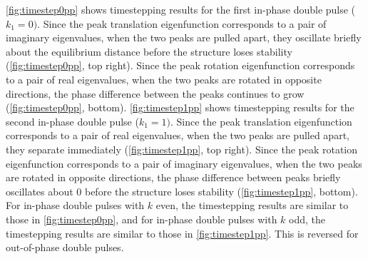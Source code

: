 \documentclass[12pt]{elsarticle}
\begin{document}
\cref{fig:timestep0pp} shows timestepping results for the first in-phase double pulse ($k_1 = 0)$. Since the peak translation eigenfunction corresponds to a pair of imaginary eigenvalues, when the two peaks are pulled apart, they oscillate briefly about the equilibrium distance before the structure loses stability (\cref{fig:timestep0pp}, top right). Since the peak rotation eigenfunction corresponds to a pair of real eigenvalues, when the two peaks are rotated in opposite directions, the phase difference between the peaks continues to grow (\cref{fig:timestep0pp}, bottom). \cref{fig:timestep1pp} shows timestepping results for the second in-phase double pulse ($k_1 = 1)$. Since the peak translation eigenfunction corresponds to a pair of real eigenvalues, when the two peaks are pulled apart, they separate immediately (\cref{fig:timestep1pp}, top right). Since the peak rotation eigenfunction corresponds to a pair of imaginary eigenvalues, when the two peaks are rotated in opposite directions, the phase difference between peaks briefly oscillates about 0 before the structure  loses stability  (\cref{fig:timestep1pp}, bottom). For in-phase double pulses with $k$ even, the timestepping results are similar to those in \cref{fig:timestep0pp}, and for in-phase double pulses with $k$ odd, the timestepping results are similar to those in \cref{fig:timestep1pp}. This is reversed for out-of-phase double pulses.
\end{document}
